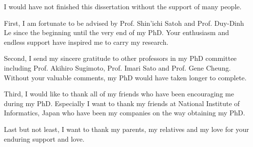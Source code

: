 
\begin{acknowledgements}      


I would have not finished this dissertation without the support of many people. 

First, I am fortunate to be advised by Prof. Shin'ichi Satoh and Prof. Duy-Dinh Le since the beginning until the very end of my PhD. Your enthusiasm and endless support have inspired me to carry my research.     

Second, I send my sincere gratitude to other professors in my PhD committee including Prof. Akihiro Sugimoto, Prof. Imari Sato and Prof. Gene Cheung. Without your valuable comments, my PhD would have taken longer to complete. 

Third, I would like to thank all of my friends who have been encouraging me during my PhD. Especially I want to thank my friends at National Institute of Informatics, Japan who have been my companies on the way obtaining my PhD.  

Last but not least, I want to thank my parents, my relatives and my love for your enduring support and love. 

\end{acknowledgements}
